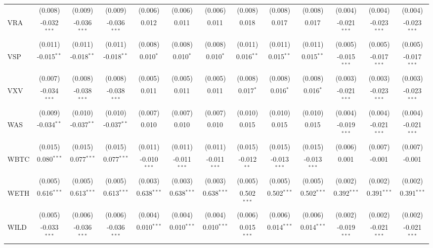 \begin{table}[!htbp]
\begin{tabular}{@{\extracolsep{5pt}}lcccccccccccc}
  & (0.008) & (0.009) & (0.009) & (0.006) & (0.006) & (0.006) & (0.008) & (0.008) & (0.008) & (0.004) & (0.004) & (0.004) \\
 VRA & -0.032$^{***}$ & -0.036$^{***}$ & -0.036$^{***}$ & 0.012$^{}$ & 0.011$^{}$ & 0.011$^{}$ & 0.018$^{}$ & 0.017$^{}$ & 0.017$^{}$ & -0.021$^{***}$ & -0.023$^{***}$ & -0.023$^{***}$ \\
  & (0.011) & (0.011) & (0.011) & (0.008) & (0.008) & (0.008) & (0.011) & (0.011) & (0.011) & (0.005) & (0.005) & (0.005) \\
 VSP & -0.015$^{**}$ & -0.018$^{**}$ & -0.018$^{**}$ & 0.010$^{*}$ & 0.010$^{*}$ & 0.010$^{*}$ & 0.016$^{**}$ & 0.015$^{**}$ & 0.015$^{**}$ & -0.015$^{***}$ & -0.017$^{***}$ & -0.017$^{***}$ \\
  & (0.007) & (0.008) & (0.008) & (0.005) & (0.005) & (0.005) & (0.008) & (0.008) & (0.008) & (0.003) & (0.003) & (0.003) \\
 VXV & -0.034$^{***}$ & -0.038$^{***}$ & -0.038$^{***}$ & 0.011$^{}$ & 0.011$^{}$ & 0.011$^{}$ & 0.017$^{*}$ & 0.016$^{*}$ & 0.016$^{*}$ & -0.021$^{***}$ & -0.023$^{***}$ & -0.023$^{***}$ \\
  & (0.009) & (0.010) & (0.010) & (0.007) & (0.007) & (0.007) & (0.010) & (0.010) & (0.010) & (0.004) & (0.004) & (0.004) \\
 WAS & -0.034$^{**}$ & -0.037$^{**}$ & -0.037$^{**}$ & 0.010$^{}$ & 0.010$^{}$ & 0.010$^{}$ & 0.015$^{}$ & 0.015$^{}$ & 0.015$^{}$ & -0.019$^{***}$ & -0.021$^{***}$ & -0.021$^{***}$ \\
  & (0.015) & (0.015) & (0.015) & (0.011) & (0.011) & (0.011) & (0.015) & (0.015) & (0.015) & (0.006) & (0.007) & (0.007) \\
 WBTC & 0.080$^{***}$ & 0.077$^{***}$ & 0.077$^{***}$ & -0.010$^{***}$ & -0.011$^{***}$ & -0.011$^{***}$ & -0.012$^{**}$ & -0.013$^{***}$ & -0.013$^{***}$ & 0.001$^{}$ & -0.001$^{}$ & -0.001$^{}$ \\
  & (0.005) & (0.005) & (0.005) & (0.003) & (0.003) & (0.003) & (0.005) & (0.005) & (0.005) & (0.002) & (0.002) & (0.002) \\
 WETH & 0.616$^{***}$ & 0.613$^{***}$ & 0.613$^{***}$ & 0.638$^{***}$ & 0.638$^{***}$ & 0.638$^{***}$ & 0.502$^{***}$ & 0.502$^{***}$ & 0.502$^{***}$ & 0.392$^{***}$ & 0.391$^{***}$ & 0.391$^{***}$ \\
  & (0.005) & (0.006) & (0.006) & (0.004) & (0.004) & (0.004) & (0.006) & (0.006) & (0.006) & (0.002) & (0.002) & (0.002) \\
 WILD & -0.033$^{***}$ & -0.036$^{***}$ & -0.036$^{***}$ & 0.010$^{***}$ & 0.010$^{***}$ & 0.010$^{***}$ & 0.015$^{***}$ & 0.014$^{***}$ & 0.014$^{***}$ & -0.019$^{***}$ & -0.021$^{***}$ & -0.021$^{***}$ \\

\end{tabular}
\end{table}
